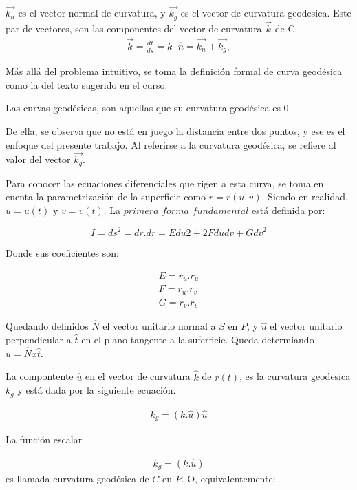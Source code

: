 \documentclass{endm}
\begin{document}
$\vec{k_n}$ es el vector normal de curvatura, y $\vec{k_g}$ es el vector de curvatura geodesica. Este par de vectores, son las componentes del vector de curvatura $\vec{k}$ de C. 
\begin{align} 
 \vec{k} = \frac{dt}{ds} = k \cdot \hat{n} = \vec{k_n} + \vec{k_g}, \label{eq1tangente}
\end{align}

M\'as all\'a del problema intuitivo, se toma la definici\'on formal de curva geod\'esica como la del texto sugerido en el curso.

\begin{defn}
Las curvas geod\'esicas, son aquellas que su curvatura geod\'esica es 0.
\end{defn}

De ella, se observa que no est\'a en juego la distancia entre dos puntos, y ese es el enfoque del presente trabajo. Al referirse a la curvatura geod\'esica, se refiere al valor del vector $\vec{k_g}$.


Para conocer las ecuaciones diferenciales que rigen a esta curva, se toma en cuenta la parametrizaci\'on de la superficie como $r=r(u,v)$. Siendo en realidad, $u=u(t)$ y $v=v(t)$. La $primera$ $forma$ $fundamental$ está definida por:

$$I = {ds}^2 = dr.dr = E{du}2 + 2Fdudv + G{dv}^2$$



Donde sus coeficientes son:

\begin{align} 
E = r_u . r_u \\ 
F = r_u . r_v \\ 
G = r_v . r_v 
\label{eq_coeficientes}
\end{align}


Quedando definidos $\hat{N}$ el vector unitario normal a $S$ en $P$, y $\hat{u}$ el vector unitario perpendicular a $\hat{t}$ en el plano tangente a la suferficie. Queda determiando  $\hat{u} = \hat{N} x \hat{t} $.


    La compontente $\hat{u}$ en el vector de curvatura $\hat{k}$ de 
    $r(t)$, es la curvatura geodesica $k_g$ y est\'a dada por la siguiente ecuaci\'on.

\begin{align} 
k_g = (k.\hat{u})\hat{u}
 \label{eqcurvatura_k_g}
\end{align}

La funci\'on escalar

\begin{align} 
k_g = (k.\hat{u})
 \label{eqcurvatura_kg}
\end{align}
es llamada curvatura geod\'esica de $C$ en $P$.
O, equivalentemente:
\end{document}
